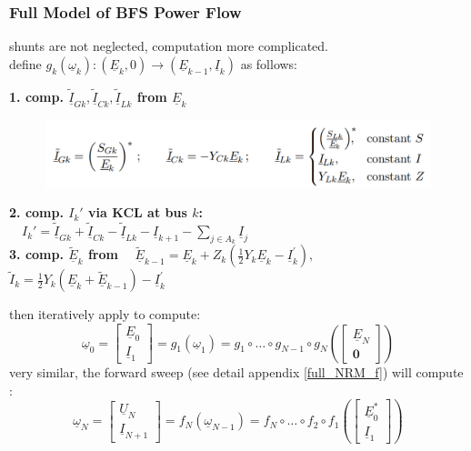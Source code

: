 \documentclass[a4paper,10pt,landscape]{scrartcl}
\begin{document}
\begin{multicols*}{3}
\subsubsection{Full Model of BFS Power Flow}
shunts are not neglected, computation more complicated.  \\
define $g_k(\underline{\omega}_k): (\underline{E}_k, 0) \rightarrow (\underline{E}_{k-1}, \underline{I}_k)$ as follows:\\
\begin{mdframed}
\textbf{1. comp. $\underline{\tilde{I}}_{Gk}, \underline{\tilde{I}}_{Ck}, \underline{\tilde{I}}_{Lk}$ from $\underline{E}_{k}$}
\begin{figure}[H]
    \centering
    \includegraphics[width=1\linewidth]{src/full_NRM_1.png}
\end{figure}
\textbf{2. comp. $I_k'$ via KCL at bus $k$: \\ $\quad I_k'=\underline{\tilde{I}}_{Gk}+\underline{\tilde{I}}_{Ck}-\underline{\tilde{I}}_{Lk}-\underline{I}_{k+1}-\sum_{j\in A_k}\underline{I}_j$} \\
\textbf{3. comp. $\underline{\tilde{E}}_{k}$ from}
$\quad \underline{\tilde{E}}_{k-1}=\underline{E}_k+Z_k\left(\frac{1}{2} Y_k \underline{E}_k-\underline{I}_k^{\prime}\right), $ \\
$\tilde{I}_k=\frac{1}{2} Y_k\left(\underline{E}_k+\underline{\tilde{E}}_{k-1}\right)-\underline{I}_k^{\prime}$ \\
\end{mdframed}
then iteratively apply to compute:
$$\underline{\omega}_0=\left[\begin{array}{c}
\underline{E}_0 \\
\underline{I}_1
\end{array}\right]=g_1\left(\underline{\omega}_1\right)=g_1 \circ \ldots \circ g_{N-1} \circ g_N\left(\left[\begin{array}{c}
\underline{E}_N \\
\mathbf{0}
\end{array}\right]\right)$$
very similar, the forward sweep (see detail appendix \ref{full_NRM_f}) will compute :
$$\underline{\omega}_N=\left[\begin{array}{c}
\underline{U}_N \\
\underline{I}_{N+1}
\end{array}\right]=f_N\left(\underline{\omega}_{N-1}\right)=f_N \circ \ldots \circ f_2 \circ f_1\left(\left[\begin{array}{c}
\underline{E}_0^* \\
\underline{I}_1
\end{array}\right]\right)$$


\end{multicols*}
\end{document}
